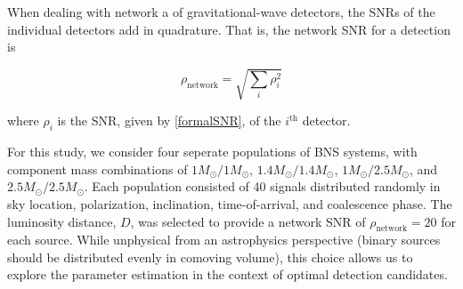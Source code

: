 \documentclass[11pt,a4paper]{emulateapj} 
\begin{document}
When dealing with network a of gravitational-wave detectors, the SNRs
of the individual detectors add in quadrature.  That is, the network
SNR for a detection is

\begin{equation}
\rho_{\text{network}} = \sqrt{\sum_i \rho_{i}^2}
\label{SNRnetwork}
\end{equation}

\noindent where $\rho_i$ is the SNR, given by \eqref{formalSNR}, of
the $i^{\text{th}}$ detector.

For this study, we consider four seperate populations of BNS systems,
with component mass combinations of $1M_{\odot}/1M_{\odot}$,
$1.4M_{\odot}/1.4M_{\odot}$, $1M_{\odot}/2.5M_{\odot}$, and
$2.5M_{\odot}/2.5M_{\odot}$.  Each population consisted of 40 signals
distributed randomly in sky location, polarization, inclination,
time-of-arrival, and coalescence phase.  The luminosity distance, $D$,
was selected to provide a network SNR of $\rho_{\text{network}}=20$
for each source.  While unphysical from an astrophysics perspective
(binary sources should be distributed evenly in comoving volume), this
choice allows us to explore the parameter estimation in the context of
optimal detection candidates.
\end{document}
